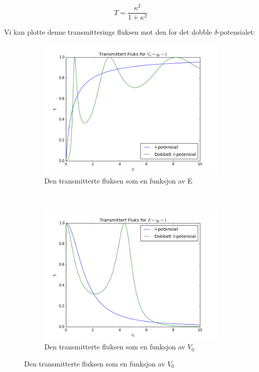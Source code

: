 \documentclass[a4paper,norsk, 10pt]{article}
\numberwithin{equation}{section}
\begin{document}
$$
T = \frac{\kappa^2}{1 + \kappa^2}
$$

Vi kan plotte denne transmitterings fluksen mot den for det dobble $\delta$-potensialet:

\begin{figure}[H]
\centering
\begin{subfigure}{0.3\textwidth}
\centering
\includegraphics[width = \textwidth]{TE.png}
\caption{Den transmitterte fluksen som en funksjon av E}
\label{fig:TE}
\end{subfigure}
~
\begin{subfigure}{0.3\textwidth}
\centering
\includegraphics[width = \textwidth]{TV.png}
\caption{Den transmitterte fluksen som en funksjon av $V_0$}
\end{subfigure}
\end{figure}
\end{document}

